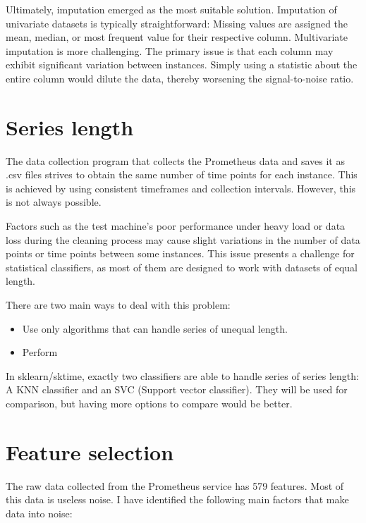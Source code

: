 Ultimately, imputation emerged as the most suitable solution. Imputation of univariate datasets is typically straightforward: Missing values are assigned the mean, median, or most frequent value for their respective column. Multivariate imputation is more challenging. The primary issue is that each column may exhibit significant variation between instances. Simply using a statistic about the entire column would dilute the data, thereby worsening the signal-to-noise ratio.
\section{Series length}
The data collection program that collects the Prometheus data and saves it as .csv files strives to obtain the same number of time points for each instance. This is achieved by using consistent timeframes and collection intervals. However, this is not always possible.

Factors such as the test machine's poor performance under heavy load or data loss during the cleaning process may cause slight variations in the number of data points or time points between some instances. This issue presents a challenge for statistical classifiers, as most of them are designed to work with datasets of equal length.

There are two main ways to deal with this problem:
\begin{itemize}
    \item Use only algorithms that can handle series of unequal length. 
    \item Perform 
\end{itemize}

In sklearn/sktime, exactly two classifiers are able to handle series of series length: A KNN classifier and an SVC (Support vector classifier). They will be used for comparison, but having more options to compare would be better.

\section{Feature selection}
The raw data collected from the Prometheus service has 579 features. Most of this data is useless noise. I have identified the following main factors that make data into noise:


